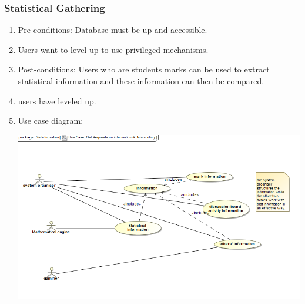 \documentclass[hidelinks, 12pt, oneside]{article}
\begin{document}
\subsubsection{Statistical Gathering}
\begin{enumerate}
 \item Pre-conditions: Database must be up and accessible.

 \item Users want to level up to use privileged mechanisms.

\item Post-conditions: Users who are students marks can be used to extract statistical information and these information can then be compared.
 
  \item users have leveled up.

  
 \item Use case diagram:\\
  \centerline{\includegraphics[scale=0.4]{getInformation}}\\

\end{enumerate}
\end{document}
